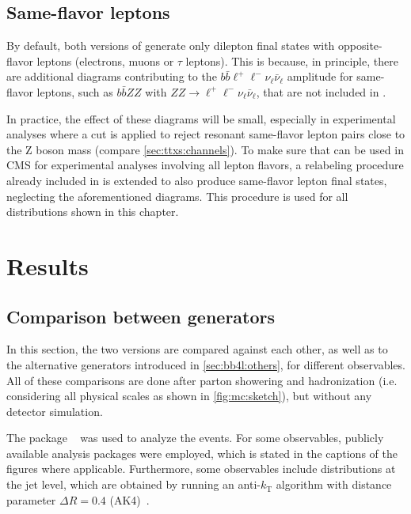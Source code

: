 \subsection{Same-flavor leptons}
\label{sec:bb4l:sameflavor}

By default, both versions of \bbfourl generate only dilepton final states with opposite-flavor leptons (electrons, muons or $\tau$ leptons). This is because, in principle, there are additional diagrams contributing to the $b \bar{b} \ell^+ \ell^- \nu_\ell \bar{\nu}_\ell$ amplitude for same-flavor leptons, such as $b \bar{b} ZZ$ with $ZZ \rightarrow \ell^+ \ell^- \nu_\ell \bar{\nu}_\ell$, that are not included in \bbfourl.

In practice, the effect of these diagrams will be small, especially in experimental analyses where a cut is applied to reject resonant same-flavor lepton pairs close to the Z boson mass (compare \cref{sec:ttxs:channels}). To make sure that \bbfourl can be used in CMS for experimental analyses involving all lepton flavors, a relabeling procedure already included in \bbfourl is extended to also produce same-flavor lepton final states, neglecting the aforementioned diagrams. This procedure is used for all \bbfourl distributions shown in this chapter.

\section{Results}

\subsection{Comparison between generators}

In this section, the two \bbfourl versions are compared against each other, as well as to the alternative generators introduced in \cref{sec:bb4l:others}, for different observables. All of these comparisons are done after parton showering and hadronization (i.e. considering all physical scales as shown in \cref{fig:mc:sketch}), but without any detector simulation.

The package \rivet~\cite{Rivet:2019rhm} was used to analyze the events. For some observables, publicly available analysis packages were employed, which is stated in the captions of the figures where applicable. Furthermore, some observables include distributions at the jet level, which are obtained by running an anti-$k_\mathrm{T}$ algorithm with distance parameter $\Delta R = 0.4$ (AK4)~\cite{Cacciari:2008gp}.

